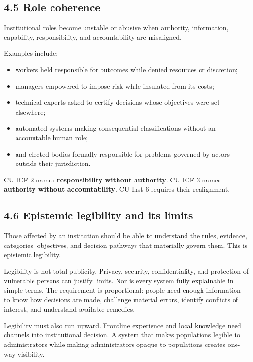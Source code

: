 \documentclass[
  11pt,
]{article}
\providecommand{\tightlist}{%
  \setlength{\itemsep}{0pt}\setlength{\parskip}{0pt}}
\begin{document}
\subsection{4.5 Role coherence}\label{role-coherence}

Institutional roles become unstable or abusive when authority,
information, capability, responsibility, and accountability are
misaligned.

Examples include:

\begin{itemize}
\tightlist
\item
  workers held responsible for outcomes while denied resources or
  discretion;
\item
  managers empowered to impose risk while insulated from its costs;
\item
  technical experts asked to certify decisions whose objectives were set
  elsewhere;
\item
  automated systems making consequential classifications without an
  accountable human role;
\item
  and elected bodies formally responsible for problems governed by
  actors outside their jurisdiction.
\end{itemize}

CU-ICF-2 names \textbf{responsibility without authority}. CU-ICF-3 names
\textbf{authority without accountability}. CU-Inst-6 requires their
realignment.

\subsection{4.6 Epistemic legibility and its
limits}\label{epistemic-legibility-and-its-limits}

Those affected by an institution should be able to understand the rules,
evidence, categories, objectives, and decision pathways that materially
govern them. This is epistemic legibility.

Legibility is not total publicity. Privacy, security, confidentiality,
and protection of vulnerable persons can justify limits. Nor is every
system fully explainable in simple terms. The requirement is
proportional: people need enough information to know how decisions are
made, challenge material errors, identify conflicts of interest, and
understand available remedies.

Legibility must also run upward. Frontline experience and local
knowledge need channels into institutional decision. A system that makes
populations legible to administrators while making administrators opaque
to populations creates one-way visibility.
\end{document}
